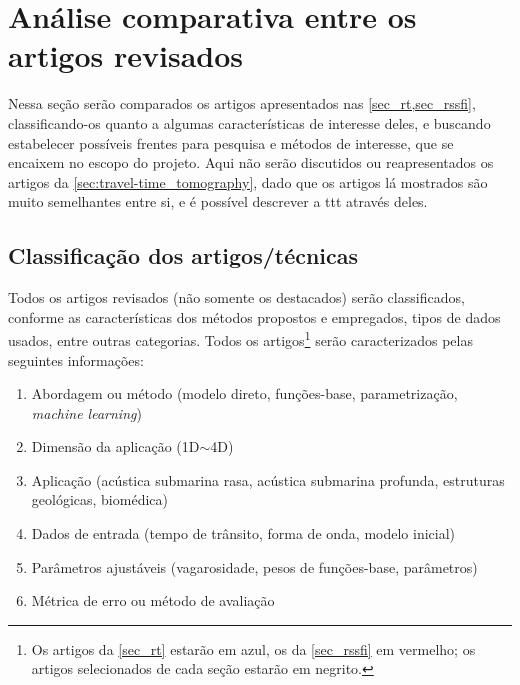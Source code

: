 \section{Análise comparativa entre os artigos revisados}
\label{sec:cp}

Nessa seção serão comparados os artigos apresentados nas \cref{sec_rt,sec_rssfi}, classificando-os quanto a algumas características de interesse deles, e buscando estabelecer possíveis frentes para pesquisa e métodos de interesse, que se encaixem no escopo do projeto. Aqui não serão discutidos ou reapresentados os artigos da \cref{sec:travel-time_tomography}, dado que os artigos lá mostrados são muito semelhantes entre si, e é possível descrever a \gls{ttt} através deles.

\subsection{Classificação dos artigos/técnicas}
\label{subsec:cp_classif}

Todos os artigos revisados (não somente os destacados) serão classificados, conforme as características dos métodos propostos e empregados, tipos de dados usados, entre outras categorias. Todos os artigos\footnote{Os artigos da \cref{sec_rt} estarão em azul, os da \cref{sec_rssfi} em vermelho; os artigos selecionados de cada seção estarão em negrito.} serão caracterizados pelas seguintes informações:
\begin{enumerate}[itemsep=-1ex, partopsep=0pt]
	\item Abordagem ou método (modelo direto, funções-base, parametrização, \textit{machine learning})
	\item Dimensão da aplicação (1D$\sim$4D)
	\item Aplicação (acústica submarina rasa, acústica submarina profunda, estruturas geológicas, biomédica)
	\item Dados de entrada (tempo de trânsito, forma de onda, modelo inicial)
	\item Parâmetros ajustáveis (vagarosidade, pesos de funções-base, parâmetros)
	\item Métrica de erro ou método de avaliação
\end{enumerate}

\begingroup
{}

\renewcommand{\arraystretch}{1.5}

